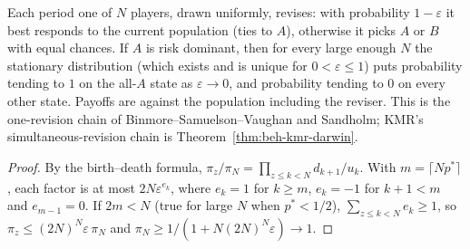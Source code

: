 \begin{theorem}
\label{thm:beh-kmr-chain}
\leanok
{}
Each period one of $N$ players, drawn uniformly, revises: with probability $1-\varepsilon$ it best responds to the
current population (ties to $A$), otherwise it picks $A$ or $B$ with equal chances. If $A$ is risk dominant, then for
every large enough $N$ the stationary distribution (which exists and is unique for $0<\varepsilon\le1$) puts
probability tending to $1$ on the all-$A$ state as $\varepsilon\to0$, and probability tending to $0$ on every other
state. Payoffs are against the population including the reviser. This is the one-revision chain of
Binmore--Samuelson--Vaughan and Sandholm; KMR's simultaneous-revision chain is Theorem~\ref{thm:beh-kmr-darwin}.
\end{theorem}
\begin{proof}
\leanok
By the birth--death formula, $\pi_z/\pi_N=\prod_{z\le k<N}d_{k+1}/u_k$. With $m=\lceil Np^*\rceil$, each factor is at
most $2N\varepsilon^{e_k}$, where $e_k=1$ for $k\ge m$, $e_k=-1$ for $k+1<m$ and $e_{m-1}=0$. If $2m<N$ (true for
large $N$ when $p^*<1/2$), $\sum_{z\le k<N}e_k\ge1$, so $\pi_z\le(2N)^N\varepsilon\,\pi_N$ and
$\pi_N\ge1/(1+N(2N)^N\varepsilon)\to1$.
\end{proof}

